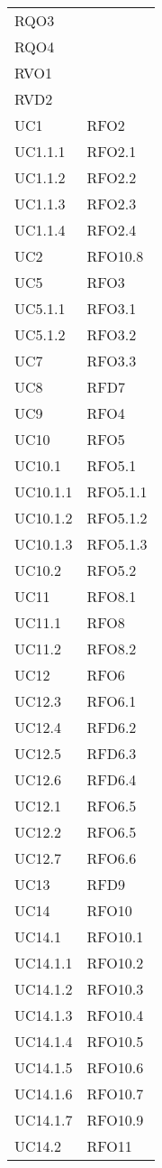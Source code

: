 \begin{longtable}{ >{\centering}p{}
			>{\centering}p{}}
RQO3 \\
RQO4 \\
RVO1 \\
RVD2
 	\tabularnewline
UC1	&	RFO2	\tabularnewline
UC1.1.1 & RFO2.1 \tabularnewline
UC1.1.2 & RFO2.2 \tabularnewline
UC1.1.3 & RFO2.3 \tabularnewline
UC1.1.4 & RFO2.4 \tabularnewline
UC2 & RFO10.8 \tabularnewline
UC5 & RFO3 \tabularnewline
UC5.1.1 & RFO3.1 \tabularnewline
UC5.1.2 & RFO3.2 \tabularnewline
UC7 & RFO3.3 \tabularnewline
UC8 & RFD7 \tabularnewline
UC9 & RFO4 \tabularnewline
UC10 & RFO5 \tabularnewline
UC10.1 & RFO5.1 \tabularnewline
UC10.1.1 & RFO5.1.1 \tabularnewline
UC10.1.2 & RFO5.1.2 \tabularnewline
UC10.1.3 & RFO5.1.3 \tabularnewline
UC10.2 & RFO5.2 \tabularnewline
UC11 & RFO8.1 \tabularnewline
UC11.1 & RFO8 \tabularnewline
UC11.2 & RFO8.2 \tabularnewline
UC12 & RFO6 \tabularnewline
UC12.3 & RFO6.1 \tabularnewline
UC12.4 & RFD6.2 \tabularnewline
UC12.5 & RFD6.3 \tabularnewline
UC12.6 & RFD6.4 \tabularnewline
UC12.1 & RFO6.5 \tabularnewline
UC12.2 & RFO6.5 \tabularnewline
UC12.7 & RFO6.6 \tabularnewline
UC13 & RFD9 \tabularnewline
UC14 & RFO10 \tabularnewline
UC14.1 & RFO10.1 \tabularnewline
UC14.1.1 & RFO10.2 \tabularnewline
UC14.1.2 & RFO10.3 \tabularnewline
UC14.1.3 & RFO10.4 \tabularnewline
UC14.1.4 & RFO10.5 \tabularnewline
UC14.1.5 & RFO10.6 \tabularnewline
UC14.1.6 & RFO10.7 \tabularnewline
UC14.1.7 & RFO10.9 \tabularnewline
UC14.2 & RFO11 \tabularnewline
	
	\end{longtable}
